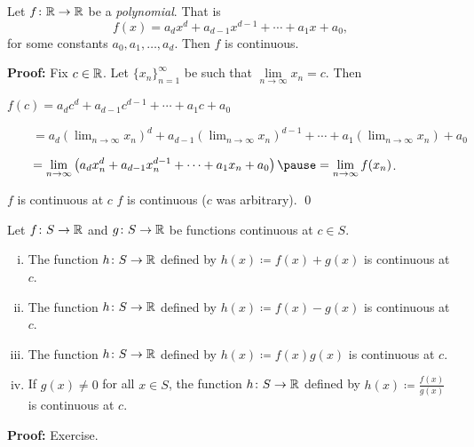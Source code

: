 \documentclass[10pt,aspectratio=169]{beamer}
\begin{document}
\begin{frame}

\begin{proposition}
Let $f \colon {\mathbb{R}} \to {\mathbb{R}}$ be a \emph{polynomial}.  That is
\begin{equation*}
f(x) = a_d x^d + a_{d-1} x^{d-1} + \cdots + a_1 x + a_0 ,
\end{equation*}
for some constants $a_0, a_1, \ldots, a_d$.
Then $f$ is continuous.
\end{proposition}

\pause
\textbf{Proof:}
Fix $c \in {\mathbb{R}}$.  
\pause
Let $\{ x_n \}_{n=1}^\infty$ be such that
$\lim\limits_{n\to\infty} x_n = c$.
\pause
Then

\medskip

$\displaystyle
f(c) =
a_d c^d + a_{d-1} c^{d-1} + \cdots + a_1 c + a_0 
$

\pause
\medskip

$\displaystyle
\qquad = 
a_d {\left(\lim_{n\to\infty} x_n\right)}^d +
a_{d-1} {\left(\lim_{n\to\infty} x_n\right)}^{d-1} + \cdots +
a_1 \left(\lim_{n\to\infty} x_n\right) + a_0 
$

\pause
\medskip

$\displaystyle
\qquad = 
\lim_{n \to \infty}
\left(
a_d x_n^d + a_{d-1} x_n^{d-1} + \cdots + a_1 x_n + a_0 
\right)
\pause
=
\lim_{n \to \infty}
f(x_n)$.

\pause
\medskip

\thus \quad $f$ is continuous at $c$
\pause
\wthus
$f$ is continuous ($c$ was arbitrary).
\qed

\end{frame}

\begin{frame}

\begin{proposition}
Let $f \colon S \to {\mathbb{R}}$ and $g \colon S \to {\mathbb{R}}$ be functions
continuous at $c \in S$.
\begin{enumerate}[(i)]
\item
\pause
The function $h \colon S \to {\mathbb{R}}$ defined by
$h(x) \coloneqq f(x)+g(x)$ is continuous at $c$.
\item
\pause
The function $h \colon S \to {\mathbb{R}}$ defined by
$h(x) \coloneqq f(x)-g(x)$ is continuous at $c$.
\item
\pause
The function $h \colon S \to {\mathbb{R}}$ defined by
$h(x) \coloneqq f(x)g(x)$ is continuous at $c$.
\item
\pause
If $g(x)\not=0$ for all $x \in S$, the function $h \colon S \to {\mathbb{R}}$
defined by $h(x) \coloneqq \frac{f(x)}{g(x)}$ is continuous at $c$.
\end{enumerate}
\end{proposition}

\pause
\textbf{Proof:} Exercise.

\end{frame}
\end{document}

